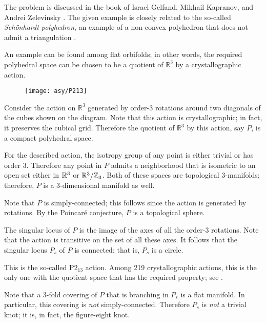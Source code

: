 The problem is discussed in the book of 
Israel Gelfand, 
Mikhail Kapranov,
and Andrei Zelevinsky  \cite[see 7C in][]{GKZ}.
The given example is closely related to the so-called \emph{Schönhardt polyhedron}, an example of a non-convex polyhedron that does not admit a triangulation \cite{schoenhardt}.

An example can be found among flat orbifolds;
in other words, the required polyhedral space can be chosen to be a quotient of $\mathbb{R}^3$ by a crystallographic action.

\begin{wrapfigure}{r}{23 mm}
\vskip-4mm
\centering
\texttt{[image: asy/P213]}
\end{wrapfigure}

\medskip

Consider the action on $\mathbb{R}^3$ generated by order-3 rotations around two diagonals of the cubes shown on the diagram.
Note that this action is crystallographic;
in fact, it preserves the cubical grid.
Therefore the quotient of $\mathbb{R}^3$ by this action, say $P$, is a compact polyhedral space.

For the described action,
the isotropy group of any point is either trivial or has order 3.
Therefore any point in $P$ admits a neighborhood that is isometric to an open set either in $\mathbb{R}^3$ or $\mathbb{R}^3/\mathbb{Z}_3$.
Both of these spaces are topological 3-manifolds;
therefore, $P$ is a 3-dimensional manifold as well. 

Note that $P$ is simply-connected;
this follows since the action is generated by rotations. 
By the Poincaré conjecture, $P$ is a topological sphere.

The singular locus of $P$ is the image of the axes of all the order-3 rotations.
Note that the action is transitive on the set of all these axes.
It follows that the singular locus $P_s$ of $P$ is connected; that is, $P_s$ is a circle.

\medskip

This is the so-called P$2_13$ action.
Among 219 crystallographic actions, this is the only one with the quotient space that has the required property; see \cite{dunbar}.

Note that a 3-fold covering of $P$ that is branching in $P_s$ is a flat manifold. 
In particular, this covering is \emph{not} simply-connected.
Therefore $P_s$ is \emph{not} a trivial knot;
it is, in fact, the figure-eight knot.

